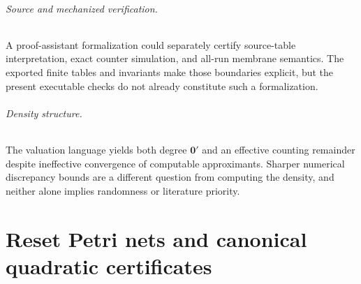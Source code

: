 \documentclass[11pt,letterpaper]{article}
\theoremstyle{definition}
\theoremstyle{remark}
\begin{document}
\paragraph{Source and mechanized verification.}
A proof-assistant formalization could separately certify source-table interpretation, exact counter simulation, and all-run membrane semantics. The exported finite tables and invariants make those boundaries explicit, but the present executable checks do not already constitute such a formalization.

\paragraph{Density structure.}
The valuation language yields both degree $\mathbf0'$ and an effective counting remainder despite ineffective convergence of computable approximants. Sharper numerical discrepancy bounds are a different question from computing the density, and neither alone implies randomness or literature priority.

\clearpage
\part{Reset Petri nets and canonical quadratic certificates}\label{qoc:rn:part}
\end{document}
